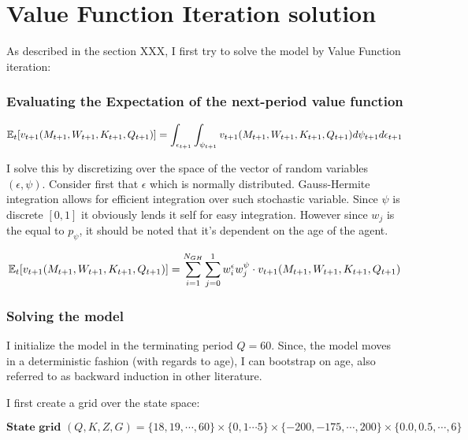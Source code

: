 \section{Value Function Iteration solution}

As described in the section XXX, I first try to solve the model by Value Function iteration:

\subsubsection{Evaluating the Expectation of the next-period value function}

\begin{equation}
    \mathbb{E}_{t}[v_{t+1}(M_{t+1}, W_{t+1}, K_{t+1}, Q_{t+1})] = \int_{\epsilon_{t+1}} \int_{\psi_{t+1}} v_{t+1} (M_{t+1}, W_{t+1}, K_{t+1}, Q_{t+1}) d \psi_{t+1}  d \epsilon_{t+1}
\end{equation}

I solve this by discretizing over the space of the vector of random variables $(\epsilon, \psi)$. Consider first that $\epsilon$ which is normally distributed. Gauss-Hermite integration allows for efficient integration over such stochastic variable. Since $\psi$ is discrete $[0,1]$ it obviously lends it self for easy integration. However since $w_j$ is the equal to $p_{\psi}$, it should be noted that it's dependent on the age of the agent. 

\begin{equation}
    \mathbb{E}_{t}[v_{t+1}(M_{t+1}, W_{t+1}, K_{t+1}, Q_{t+1})] =  \sum_{i=1}^{N_{GH}} \sum_{j=0}^{1} w_{i}^{\epsilon} w_{j}^{\psi}  \cdot v_{t+1} (M_{t+1}, W_{t+1}, K_{t+1}, Q_{t+1}) 
\end{equation}    

\subsubsection{Solving the model}

I initialize the model in the terminating period $Q=60$. Since, the model moves in a deterministic fashion (with regards to age), I can bootstrap on age, also referred to as backward induction in other literature.

I first create a grid over the state space: 

\begin{equation}
    \textbf{State grid } (Q, K, Z, G) = \{18, 19, \cdots, 60\} \times \{0, 1 \cdots 5\} \times \{-200, - 175, \cdots, 200 \} \times \{0.0, 0.5, \cdots,  6\} 
\end{equation}

